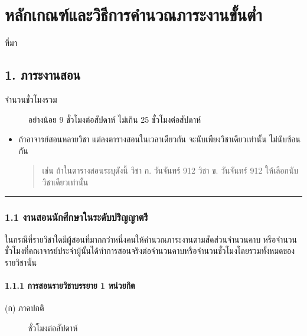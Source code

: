 \documentclass[a4paper,12pt,english]{sphinxmanual}
\begin{document}
\chapter{หลักเกณฑ์และวิธีการคำนวณภาระงานขั้นต่ำ}
\label{\detokenize{workload_rubric:id1}}\label{\detokenize{workload_rubric::doc}}
ที่มา {\hyperref[\detokenize{official_documents:official-documents}]{}}


\section{1. ภาระงานสอน}
\label{\detokenize{workload_rubric:id2}}\begin{description}
\item[{จำนวนชั่วโมงรวม}] \leavevmode
อย่างน้อย 9 ชั่วโมงต่อสัปดาห์ ไม่เกิน 25 ชั่วโมงต่อสัปดาห์

\end{description}
\begin{itemize}
\item {} 
ถ้าอาจารย์สอนหลายวิชา แต่ลงตารางสอนในเวลาเดียวกัน จะนับเพียงวิชาเดียวเท่านั้น ไม่นับซ้อนกัน
\begin{quote}

เช่น ถ้าในตารางสอนระบุดังนี้
วิชา ก. วันจันทร์ 9\sphinxhyphen{}12
วิชา ข. วันจันทร์ 9\sphinxhyphen{}12
ให้เลือกนับวิชาเดียวเท่านั้น
\end{quote}

\end{itemize}


\bigskip\hrule\bigskip



\subsection{1.1 งานสอนนักศึกษาในระดับปริญญาตรี}
\label{\detokenize{workload_rubric:id3}}
ในกรณีที่รายวิชาใดมีผู้สอนที่มากกว่าหนึ่งคนให้คำนวณภาระงานตามสัดส่วนจำนวนคาบ หรือจำนวนชั่วโมงที่คณาจารย์ประจำผู้นั้นได้ทำการสอนจริงต่อจำนวนคาบหรือจำนวนชั่วโมงโดยรวมทั้งหมดของรายวิชานั้น


\subsubsection{1.1.1 การสอนรายวิชาบรรยาย 1 หน่วยกิต}
\label{\detokenize{workload_rubric:id4}}\begin{description}
\item[{(ก) ภาคปกติ}]  ชั่วโมงต่อสัปดาห์

\end{description}
\end{document}
